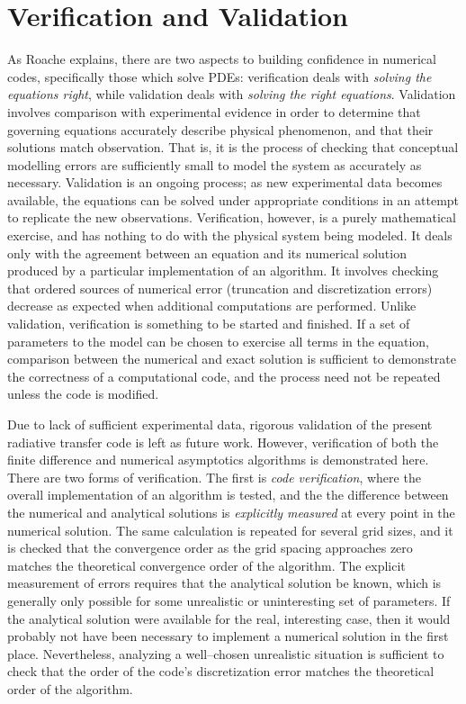 \section{Verification and Validation}
\label{sec:v2}
As Roache explains, there are two aspects to building confidence in numerical codes, specifically those which solve PDEs:
verification deals with \textit{solving the equations right}, while validation deals with \textit{solving the right equations}.
Validation involves comparison with experimental evidence in order to determine that governing equations
accurately describe physical phenomenon, and that their solutions match observation.
That is, it is the process of checking that conceptual modelling errors are sufficiently small to model the system as accurately as necessary.
Validation is an ongoing process; as new experimental data becomes available, the equations can be solved under appropriate conditions in an attempt to replicate the new observations.
Verification, however, is a purely mathematical exercise, and has nothing to do with the physical system being modeled.
It deals only with the agreement between an equation and its numerical solution produced by a particular implementation of an algorithm.
It involves checking that ordered sources of numerical error (truncation and discretization errors) decrease as expected when additional computations are performed.
Unlike validation, verification is something to be started and finished.
If a set of parameters to the model can be chosen to exercise all terms in the equation, comparison between the numerical and exact solution is sufficient to demonstrate the correctness of a computational code, and the process need not be repeated unless the code is modified.

Due to lack of sufficient experimental data, rigorous validation of the present radiative transfer code is left as future work.
However, verification of both the finite difference and numerical asymptotics algorithms is demonstrated here.
There are two forms of verification.
The first is \textit{code verification}, where the overall implementation of an algorithm is tested, and the the difference between the numerical and analytical solutions is \textit{explicitly measured} at every point in the numerical solution.
The same calculation is repeated for several grid sizes, and it is checked that the convergence order as the grid spacing approaches zero matches the theoretical convergence order of the algorithm.
The explicit measurement of errors requires that the analytical solution be known, which is generally only possible for some unrealistic or uninteresting set of parameters.
If the analytical solution were available for the real, interesting case, then it would probably not have been necessary to implement a numerical solution in the first place.
Nevertheless, analyzing a well--chosen unrealistic situation is sufficient to check that the order of the code's discretization error matches the theoretical order of the algorithm.

